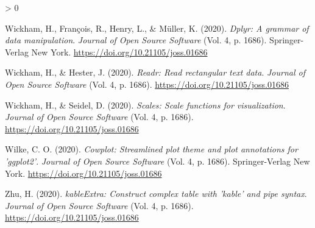 \documentclass[
  english,
  ,man,floatsintext]{apa6}
\newlength{\cslhangindent}
\newenvironment{CSLReferences}[2] %
 {%
  \setlength{\parindent}{0pt}
  \ifodd #1 \everypar{\setlength{\hangindent}{\cslhangindent}}\ignorespaces\fi
  \ifnum #2 > 0
  \setlength{\parskip}{#2\baselineskip}
  \fi
 }%
 {}
\begin{document}
\begin{CSLReferences}{1}{0}
\leavevmode\hypertarget{ref-R-dplyr}{}%
Wickham, H., François, R., Henry, L., \& Müller, K. (2020). \emph{Dplyr: A grammar of data manipulation}. \emph{Journal of Open Source Software} (Vol. 4, p. 1686). Springer-Verlag New York. \url{https://doi.org/10.21105/joss.01686}

\leavevmode\hypertarget{ref-R-readr}{}%
Wickham, H., \& Hester, J. (2020). \emph{Readr: Read rectangular text data}. \emph{Journal of Open Source Software} (Vol. 4, p. 1686). \url{https://doi.org/10.21105/joss.01686}

\leavevmode\hypertarget{ref-R-scales}{}%
Wickham, H., \& Seidel, D. (2020). \emph{Scales: Scale functions for visualization}. \emph{Journal of Open Source Software} (Vol. 4, p. 1686). \url{https://doi.org/10.21105/joss.01686}

\leavevmode\hypertarget{ref-R-cowplot}{}%
Wilke, C. O. (2020). \emph{Cowplot: Streamlined plot theme and plot annotations for 'ggplot2'}. \emph{Journal of Open Source Software} (Vol. 4, p. 1686). Springer-Verlag New York. \url{https://doi.org/10.21105/joss.01686}

\leavevmode\hypertarget{ref-R-kableExtra}{}%
Zhu, H. (2020). \emph{kableExtra: Construct complex table with 'kable' and pipe syntax}. \emph{Journal of Open Source Software} (Vol. 4, p. 1686). \url{https://doi.org/10.21105/joss.01686}

\end{CSLReferences}

\endgroup


\clearpage
\makeatletter
\efloat@restorefloats
\makeatother
\end{document}
